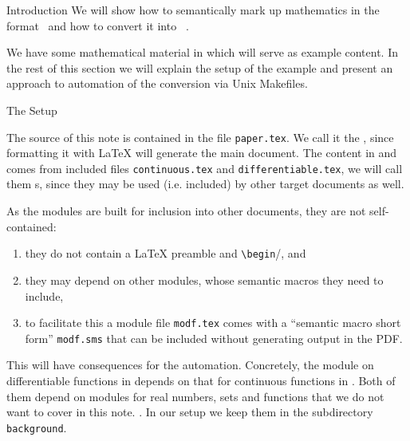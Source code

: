 \begin{omgroup}[id=intro]{Introduction}
  We will show how to semantically mark up mathematics in the {\sTeX}
  format~\cite{Kohlhase:ulsmf08} and how to convert it into
  {\omdoc}~\cite{Kohlhase:OMDoc1.3}.

  We have some mathematical material in {} which will serve as example
  content. In the rest of this section we will explain the setup of the example and
  present an approach to automation of the {\omdoc} conversion via Unix Makefiles.
  \begin{omgroup}{The Setup}
    \begin{module}[name=setup]
    \begin{definition}[display=flow]
      The source of this note is contained in the file {\texttt{paper.tex}}. We call it
     the {}, since formatting it with {\LaTeX} will generate the main
      document. The content in {} and {}
      comes from included files {\texttt{continuous.tex}} and
     {\texttt{differentiable.tex}}, we will call them {s}, since they may
      be used (i.e. included) by other target documents as well.
    \end{definition}

    \begin{omtext}
      As the modules are built for inclusion into other documents, they are not
      self-contained:
    \begin{enumerate}
    \item they do not contain a {\LaTeX} preamble and
      \verb|\begin|/\verb||, and
    \item they may depend on other modules, whose semantic macros they need to include,
    \item to facilitate this a module file {\texttt{modf.tex}} comes with a ``semantic
      macro short form'' {\texttt{modf.sms}} that can be included without generating
      output in the PDF.
    \end{enumerate}
  \end{omtext}
  
  \begin{omtext}
    This will have consequences for the automation. Concretely, the module on
    differentiable functions in {} depends on that for continuous
    functions in {}. Both of them depend on modules for real numbers,
    sets and functions that we do not want to cover in this note. . In our setup we
    keep them in the subdirectory {\texttt{background}}.
  \end{omtext}
\end{module}
\end{omgroup}


\end{omgroup}
